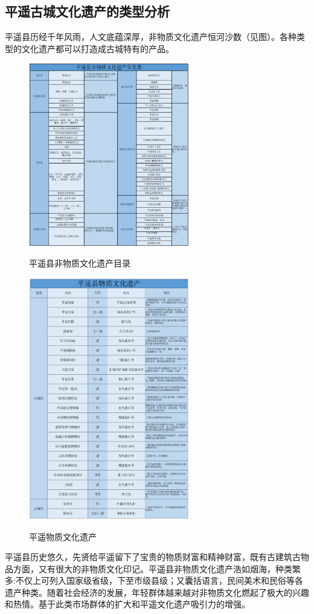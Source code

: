 \documentclass[UTF8]{ctexart}
\begin{document}
    \subsection{平遥古城文化遗产的类型分析}
    平遥县历经千年风雨，人文底蕴深厚，非物质文化遗产恒河沙数（见图）。各种类型的文化遗产都可以打造成古城特有的产品。
\begin{figure}[H]
    \centering
    \caption{平遥县非物质文化遗产目录}
    \includegraphics[width=7cm]{非物质文化遗产.png}
    \label{fig:my_label}
\end{figure}
\begin{figure}[H]
    \centering
    \caption{平遥物质文化遗产}
    \includegraphics[width=7cm]{物质文化遗产.png}
    \label{fig:my_label}
\end{figure}
平遥县历史悠久，先贤给平遥留下了宝贵的物质财富和精神财富，既有古建筑古物品方面，又有很大的非物质文化印记。平遥县非物质文化遗产浩如烟海，种类繁多:不仅上可列入国家级省级，下至市级县级；又囊括语言，民间美术和民俗等各遗产种类。随着社会经济的发展，年轻群体越来越对非物质文化燃起了极大的兴趣和热情。基于此类市场群体的扩大和平遥文化遗产吸引力的增强。
\end{document}

